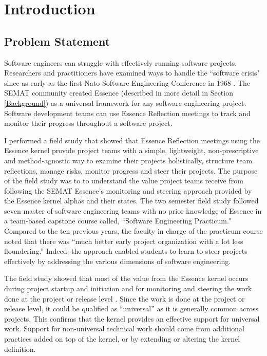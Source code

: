 \documentclass[preprint,12pt,3p]{elsarticle}
\begin{document}

\section{Introduction}

\subsection{Problem Statement}
Software engineers can struggle with effectively running software projects. Researchers and practitioners have examined ways to handle the ``software crisis" since as early as the first Nato Software Engineering Conference in 1968 \cite{Naur1969}. The SEMAT community created Essence (described in more detail in Section \ref{Background}) as a universal framework for any software engineering project.  Software development teams can use Essence Reflection meetings \cite{EASE2014} to track and monitor their progress throughout a software project. 

I performed a field study \cite{ICSE2014} that showed that Essence Reflection meetings \cite{EASE2014} using the Essence kernel provide project teams with a simple, lightweight, non-prescriptive and method-agnostic way to examine their projects holistically, structure team reflections, manage risks, monitor progress and steer their projects. The purpose of the field study was to to understand the value project teams receive from following the SEMAT Essence’s monitoring and steering approach provided by the Essence kernel alphas and their states. The two semester field study followed seven master of software engineering teams with no prior knowledge of Essence in a team-based capstone course called, ``Software Engineering Practicum." Compared to the ten previous years, the faculty in charge of the practicum course noted that there was “much better early project organization with a lot less floundering.” Indeed, the approach enabled students to learn to steer projects effectively by addressing the various dimensions of software engineering.

The field study showed that most of the value from the Essence kernel occurs during project startup and initiation and for monitoring and steering the work done at the project or release level \cite{ICSE2014}. Since the work is done at the project or release level, it could be qualified as “universal” as it is generally common across projects. This confirms that the kernel provides an effective support for universal work. Support for non-universal technical work should come from additional practices added on top of the kernel, or by extending or altering the kernel definition.
\end{document}
